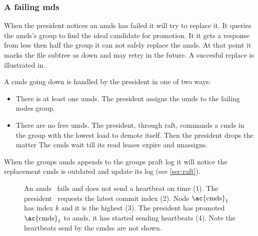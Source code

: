 \subsubsection*{A failing \ac{mds}}
When the president notices an \ac{amds} has failed it will try to replace it. It queries the \ac{amds}'s group to find the ideal candidate for promotion. It it gets a response from less then half the group it can not safely replace the \ac{amds}. At that point it marks the file subtree as down and may retry in the future. A succesful replace is illustrated in .

A \ac{cmds} going down is handled by the president in one of two ways:
\begin{itemize}
	\item There is at least one \ac{umds}. The president assigns the \ac{umds} to the failing nodes group. 
	\item There are no free \ac{umds}. The president, through raft, commands a \ac{cmds} in the group with the lowest load to demote itself. Then the president drops the matter The \ac{cmds} wait till its read leases expire and unassigns.
\end{itemize}
When the groups \ac{amds} appends to the groups \ac{praft} log it will notice the replacement \ac{cmds} is outdated and update its log (see \cref{sec:raft}).

\begin{figure}[htbp]
	\centering
	
	\caption{An \ac{amds}~\amdsLeg{} fails and does not send a heartbeat on time (1). The president~\presidentLeg{} requests the latest commit index (2). Node $\text{\ac{cmds}}_1$~\cmdsLeg{} has index $k$ and it is the highest (3). The president has promoted $\text{\ac{cmds}}_1$ to \ac{amds}, it has started sending heartbeats (4). Note the heartbeats send by the \acp{cmds} are not shown.}
	\label{fig:appoint}
\end{figure}
%
